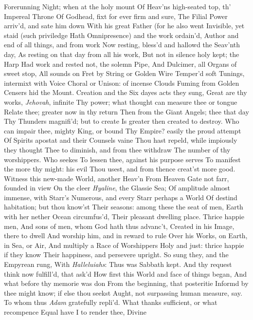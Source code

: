 \documentclass[11pt]{book}
\newcounter {first}
\begin{document}
Forerunning Night; when at the holy mount 
Of Heav'ns high-seated top, th' Impereal Throne 
Of Godhead, fixt for ever firm and sure, 
The Filial Power arriv'd, and sate him down 
With his great Father (for he also went 
Invisible, yet staid (such priviledge 
Hath Omnipresence) and the work ordain'd, 
Author and end of all things, and from work 
Now resting, bless'd and hallowd the Seav'nth day, 
As resting on that day from all his work, 
But not in silence holy kept; the Harp 
Had work and rested not, the solemn Pipe, 
And Dulcimer, all Organs of sweet stop, 
All sounds on Fret by String or Golden Wire 
Temper'd soft Tunings, intermixt with Voice 
Choral or Unison: of incense Clouds 
Fuming from Golden Censers hid the Mount. 
Creation and the Six dayes acts they sung, 
Great are thy works, \textit{Jehovah}, infinite 
Thy power; what thought can measure thee or tongue 
Relate thee; greater now in thy return 
Then from the Giant Angels; thee that day 
Thy Thunders magnifi'd; but to create 
Is greater then created to destroy. 
Who can impair thee, mighty King, or bound 
Thy Empire? easily the proud attempt 
Of Spirits apostat and their Counsels vaine 
Thou hast repeld, while impiously they thought 
Thee to diminish, and from thee withdraw 
The number of thy worshippers.  Who seekes 
To lessen thee, against his purpose serves 
To manifest the more thy might: his evil 
Thou usest, and from thence creat'st more good. 
Witness this new-made World, another Heav'n 
From Heaven Gate not farr, founded in view 
On the cleer \textit{Hyaline}, the Glassie Sea; 
Of amplitude almost immense, with Starr's 
Numerous, and every Starr perhaps a World 
Of destind habitation; but thou know'st 
Their seasons: among these the seat of men, 
Earth with her nether Ocean circumfus'd, 
Their pleasant dwelling place.  Thrice happie men, 
And sons of men, whom God hath thus advanc't, 
Created in his Image, there to dwell 
And worship him, and in reward to rule 
Over his Works, on Earth, in Sea, or Air, 
And multiply a Race of Worshippers 
Holy and just: thrice happie if they know 
Their happiness, and persevere upright. 
\quad So sung they, and the Empyrean rung, 
With \textit{Halleluiahs}: Thus was Sabbath kept. 
And thy request think now fulfill'd, that ask'd 
How first this World and face of things began, 
And what before thy memorie was don 
From the beginning, that posteritie 
Informd by thee might know; if else thou seekst 
Aught, not surpassing human measure, say. 
\quad To whom thus \textit{Adam} gratefully repli'd. 
What thanks sufficient, or what recompence 
Equal have I to render thee, Divine 
\end{document}

